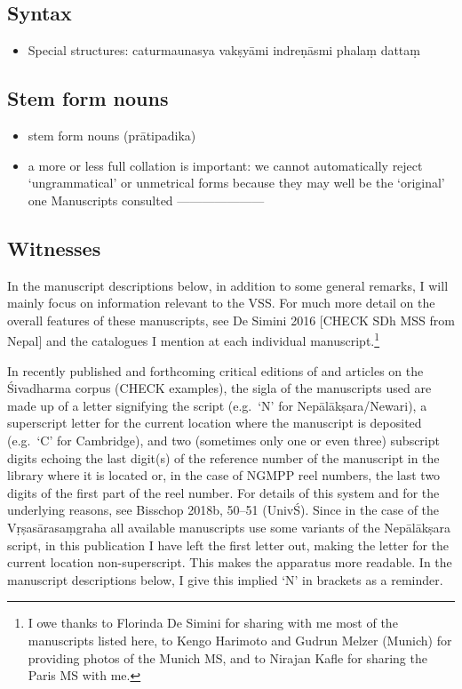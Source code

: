 \documentclass[12pt]{book}
\begin{document}
{%
\subsection{Syntax}\label{syntax}}

\begin{itemize}

\item
  Special structures: caturmaunasya vakṣyāmi indreṇāsmi phalaṃ dattaṃ
\end{itemize}

{%
\subsection{Stem form nouns}\label{stem-form-nouns}}

\begin{itemize}
\item
  stem form nouns (prātipadika)
\item
  a more or less full collation is important: we cannot automatically
  reject `ungrammatical' or unmetrical forms because they may well be
  the `original' one Manuscripts consulted ---------------------
\end{itemize}

{%
\subsection{Witnesses}\label{witnesses}}

In the manuscript descriptions below, in addition to some general
remarks, I will mainly focus on information relevant to the VSS. For
much more detail on the overall features of these manuscripts, see De
Simini 2016 {[}CHECK SDh MSS from Nepal{]} and the catalogues I mention
at each individual manuscript.\footnote{I owe thanks to Florinda De
  Simini for sharing with me most of the manuscripts listed here, to
  Kengo Harimoto and Gudrun Melzer (Munich) for providing photos of the
  Munich MS, and to Nirajan Kafle for sharing the Paris MS with me.}

In recently published and forthcoming critical editions of and articles
on the Śivadharma corpus (CHECK examples), the sigla of the manuscripts
used are made up of a letter signifying the script (e.g.~`N' for
Nepālākṣara/Newari), a superscript letter for the current location where
the manuscript is deposited (e.g.~`C' for Cambridge), and two (sometimes
only one or even three) subscript digits echoing the last digit(s) of
the reference number of the manuscript in the library where it is
located or, in the case of NGMPP reel numbers, the last two digits of
the first part of the reel number. For details of this system and for
the underlying reasons, see Bisschop 2018b, 50--51 (UnivŚ). Since in the
case of the Vṛṣasārasaṃgraha all available manuscripts use some variants
of the Nepālākṣara script, in this publication I have left the first
letter out, making the letter for the current location non-superscript.
This makes the apparatus more readable. In the manuscript descriptions
below, I give this implied `N' in brackets as a reminder.
\end{document}
